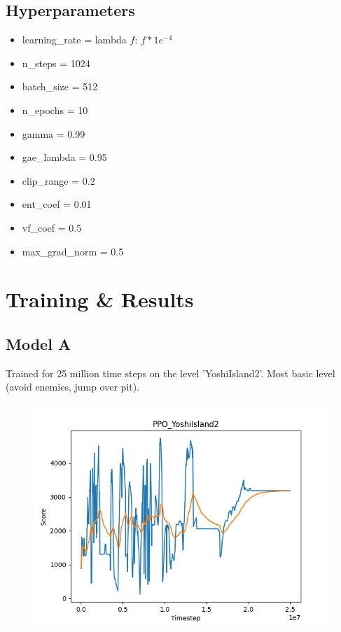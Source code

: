 \documentclass{article}
\begin{document}
    \subsection{Hyperparameters}
    \begin{itemize}
        \item learning\_rate = lambda $f$: $f * 1e^{-4}$
        \item n\_steps = 1024
        \item batch\_size = 512
        \item n\_epochs = 10
        \item gamma = 0.99
        \item gae\_lambda = 0.95
        \item clip\_range = 0.2
        \item ent\_coef = 0.01
        \item vf\_coef = 0.5
        \item max\_grad\_norm = 0.5
    \end{itemize}
    \section{Training \& Results}
    \subsection{Model A}
    Trained for 25 million time steps on the level 'YoshiIsland2'.
    Most basic level (avoid enemies, jump over pit).
    \begin{figure}[H]
        \centering
        \includegraphics[width=\textwidth]{plot_model_a.png}
    \end{figure}
\end{document}
